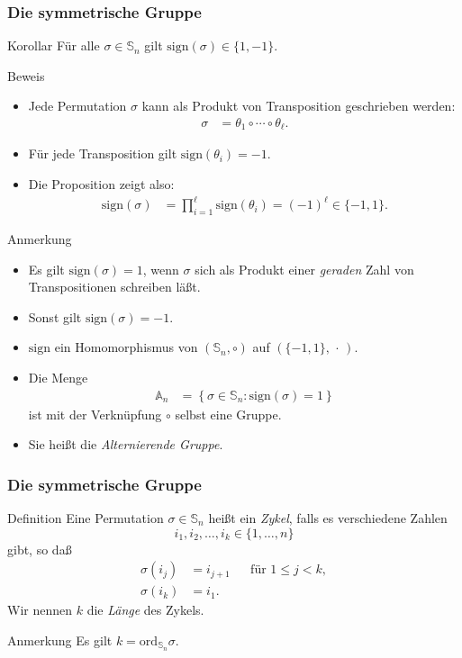\documentclass{beamer}
\renewcommand{\emph}[1]{{\textcolor{solarizedRed}{\itshape #1}}}
\renewcommand\AA{\mathbb A}
\renewcommand\SS{\mathbb S}
\newcommand\sign{\mathrm{sign}}
\newcommand\cbc[1]{\left\{{#1}\right\}}
\renewcommand{\ae}{\"a}
\newcommand{\ue}{\"u}
\begin{document}
\begin{frame}\frametitle{Die symmetrische Gruppe}
	\begin{block}{Korollar}
		F\ue r alle $\sigma\in\SS_n$ gilt	$\sign(\sigma)\in\{1,-1\}$.
	\end{block}
	\begin{overprint}
		\begin{block}{Beweis}
			\begin{itemize}
				\item Jede Permutation $\sigma$ kann als Produkt von Transposition geschrieben werden:
					\begin{align*}
						\sigma&=\theta_1\circ\cdots\circ\theta_\ell.
					\end{align*}
				\item F\ue r jede Transposition gilt $\sign(\theta_i)=-1$.
				\item Die Proposition zeigt also:
					\begin{align*}
						\sign(\sigma)&=\prod_{i=1}^\ell\sign(\theta_i)=(-1)^\ell\in\{-1,1\}.
					\end{align*}
			\end{itemize}	
		\end{block}	
		\begin{block}{Anmerkung}
			\begin{itemize}
				\item Es gilt $\sign(\sigma)=1$, wenn $\sigma$ sich als Produkt einer \emph{geraden} Zahl von Transpositionen schreiben l\ae\ss t.
				\item Sonst gilt $\sign(\sigma)=-1$.
				\item $\sign$ ein Homomorphismus von $(\SS_n,\circ)$ auf $(\{-1,1\},\,\cdot\,)$.
				\item Die Menge
					\begin{align*}
						\AA_n&=\cbc{\sigma\in\SS_n:\sign(\sigma)=1}
					\end{align*}
					ist mit der Verkn\ue pfung $\circ$ selbst eine Gruppe.
				\item Sie hei\ss t die \emph{Alternierende Gruppe}.
			\end{itemize}
		\end{block}
	\end{overprint}
\end{frame}

\begin{frame}\frametitle{Die symmetrische Gruppe}
\begin{block}{Definition}
	Eine Permutation $\sigma\in\SS_n$ hei\ss t ein \emph{Zykel}, falls es verschiedene Zahlen $$i_1,i_2,\ldots,i_k\in\{1,\ldots,n\}$$ gibt, so da\ss
	\begin{align*}
		\sigma(i_j)&=i_{j+1}&&\mbox{f\ue r }1\leq j<k,\\
		\sigma(i_k)&=i_1.
	\end{align*}
	Wir nennen $k$ die \emph{L\ae nge} des Zykels.
\end{block}
\begin{block}{Anmerkung}
	Es gilt $k=\mathrm{ord}_{\SS_n}\sigma$.
\end{block}
\end{frame}
\end{document}
